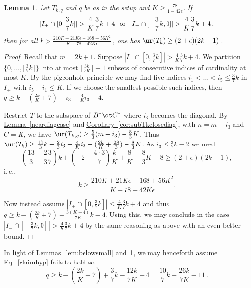 \documentclass[11pt]{article}
\newcommand{\expref}[2]{\texorpdfstring{\hyperref[#2]{#1~\ref{#2}}}{#1~\ref{#2}}}
\newcommand{\expeqref}[2]{\texorpdfstring{\hyperref[#2]{#1~\eqref{#2}}}{#1~\eqref{#2}}}
\newtheorem{lemma}[theorem]{Lemma}
\newcommand{\ie}{i.\,e.}
\begin{document}
\begin{lemma}\label{claim:no5large} Let $T_{k,q}$ and $q$ be as in the setup and $K \geq \frac{78}{1 - 42 \epsilon}$.
If  
\begin{equation}
    \label{claimhyp}
|I_{+}\cap[0,\frac{3}{7}k]|> \frac{4}{K}\frac{3}{7}k+4\ \ {\rm or}\ \ |I_{-}\cap[-\frac{3}{7}k,0]|> \frac{4}{K}\frac{3}{7}k+4\,,
\end{equation}
then 
for all $k>\frac{210K+21K\epsilon-168+56K^2}{K-78-42K\epsilon}$\,, one has
$\ur(T_k)\geq (2+\epsilon)(2k+1)$\,.
\end{lemma}
\begin{proof} 
Recall that $m=2k+1$. 
Suppose  $|I_{+}\cap[0,\frac{3}{7}k]|> \frac{4}{K}\frac{3}{7}k+4$. We partition $\{0,\dots,\lfloor\frac{3}{7}k\rfloor\}$ into at most $\lfloor\frac{3k}{7K}\rfloor+1$ subsets of consecutive indices of cardinality at most $K$. By the pigeonhole principle
we may find five indices $i_1<\dots<i_5\leq \frac{3}{7}k$ in $I_{+}$ with $i_5-i_1\leq K$. If we choose
the  smallest possible such indices, then $q\geq k-(\frac{2k}{K}+7)+ i_3-\frac 4K i_3-4$.

Restrict $T$ to the subspace of $B^*\ot C^*$ where  $i_3$ becomes the diagonal.
By \expref{Lemma}{neardiagcase} and \expref{Corollary}{cor:subTkclosediag}, with $n=m-i_3$ and $C=K$,  
we have $\ur(T_{k,q})\geq \frac 53(m-i_3)-\frac 83K$.
Thus $\ur(T_k)\geq \frac{13}{3}k-\frac{2}{3}i_3-\frac{4}{K}i_3-(\frac{2k}{K}+\frac{28}{3})-\frac 83K$. As $i_3\leq \frac{3}{7}k-2$ we 
need
$$
\left(\frac {13}3-\frac 23\frac 37\right)k+(-2-\frac{4\cdot 3}7)\frac{k}K +\frac{8}K - \frac 83K-8\geq (2+\epsilon)(2k+1),
$$
\ie,
$$
k\geq \frac{210K+21K\epsilon-168+56K^2}{K-78-42K\epsilon}.
$$

Now instead  assume $|I_{+}\cap[0,\frac{3}{7}k]|\leq \frac{4}{K}\frac{3}{7}k+4$ 
and thus  $q\geq k-(\frac{2k}{K}+7)+\frac{3(K-4)}{7K}k-4$. Using this, we may conclude   in the
case $|I_{-}\cap[-\frac{3}{7}k,0]|> \frac{4}{K}\frac{3}{7}k+4$ by the same reasoning as above with an even better bound.  
\end{proof}
In light of \expref{Lemmas}{lem:belowsmall} \expref{and}{claim:no5large}, we may henceforth
assume \expeqref{Eq.}{claimhyp} %
fails  to hold so 
\begin{equation}\label{qbnd}
q\geq
k-\left(\frac{2k}{K}+7\right)+\frac 37k-\frac{12k}{7K}-4=\frac{10}{7}k-\frac{26k}{7K}-11\,.
\end{equation}
\end{document}
